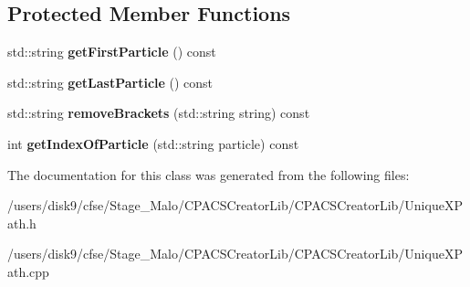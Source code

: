 \subsection*{Protected Member Functions}
\begin{DoxyCompactItemize}
\item 
\hypertarget{classcpcr_1_1UniqueXPath_acea27820254cf048b266e8e724a16149}{std\-::string {\bfseries get\-First\-Particle} () const }\label{classcpcr_1_1UniqueXPath_acea27820254cf048b266e8e724a16149}

\item 
\hypertarget{classcpcr_1_1UniqueXPath_a88f0947267c575930684dc145219f3ba}{std\-::string {\bfseries get\-Last\-Particle} () const }\label{classcpcr_1_1UniqueXPath_a88f0947267c575930684dc145219f3ba}

\item 
\hypertarget{classcpcr_1_1UniqueXPath_a30d808df397f4800908ef0cb9a79471c}{std\-::string {\bfseries remove\-Brackets} (std\-::string string) const }\label{classcpcr_1_1UniqueXPath_a30d808df397f4800908ef0cb9a79471c}

\item 
\hypertarget{classcpcr_1_1UniqueXPath_aae8a2435296b2cb50e9d3c74f2c00c8f}{int {\bfseries get\-Index\-Of\-Particle} (std\-::string particle) const }\label{classcpcr_1_1UniqueXPath_aae8a2435296b2cb50e9d3c74f2c00c8f}

\end{DoxyCompactItemize}


The documentation for this class was generated from the following files\-:\begin{DoxyCompactItemize}
\item 
/users/disk9/cfse/\-Stage\-\_\-\-Malo/\-C\-P\-A\-C\-S\-Creator\-Lib/\-C\-P\-A\-C\-S\-Creator\-Lib/Unique\-X\-Path.\-h\item 
/users/disk9/cfse/\-Stage\-\_\-\-Malo/\-C\-P\-A\-C\-S\-Creator\-Lib/\-C\-P\-A\-C\-S\-Creator\-Lib/Unique\-X\-Path.\-cpp\end{DoxyCompactItemize}
